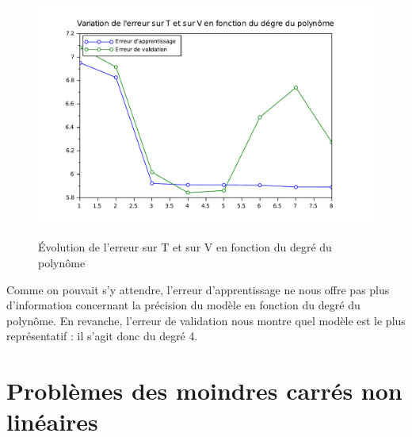 \documentclass[a4paper,10pt]{report}
\begin{document}
\begin{figure}[H]
\centering
\caption{Évolution de l'erreur sur T et sur V en fonction du degré du polynôme}
\includegraphics[width=12cm]{erreur_validation.pdf}
\label{erreur_validation}
\end{figure}

Comme on pouvait s'y attendre, l'erreur d'apprentissage ne nous offre pas plus d'information concernant la précision du modèle en fonction du degré du polynôme. En revanche, l'erreur de validation nous montre quel modèle est le plus représentatif : il s'agit donc du degré 4.



\section{Problèmes des moindres carrés non linéaires}
\end{document}
